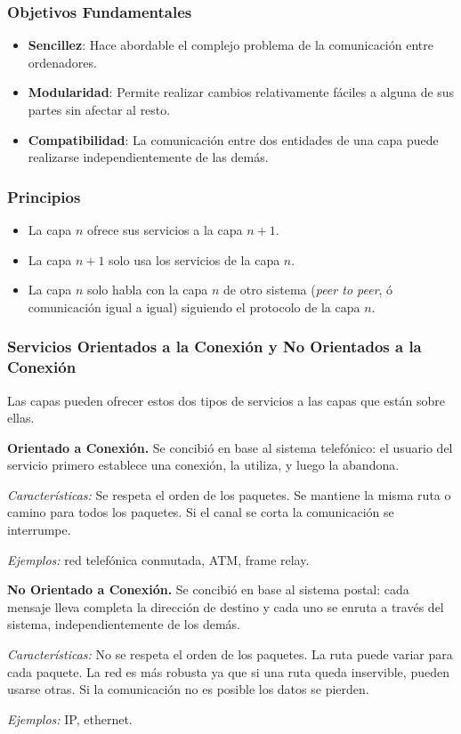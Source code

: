\documentclass[10pt,a4paper]{article}
\begin{document}
\subsubsection{Objetivos Fundamentales}
\begin{itemize}
\item \textbf{Sencillez}: Hace abordable el complejo problema de la comunicación entre ordenadores.
\item \textbf{Modularidad}: Permite realizar cambios relativamente fáciles a alguna de sus partes sin afectar al resto.
\item \textbf{Compatibilidad}: La comunicación entre dos entidades de una capa puede realizarse independientemente de las demás.
\end{itemize}

\subsubsection{Principios}
\begin{itemize}
\item La capa $n$ ofrece sus servicios a la capa $n+1$.
\item La capa $n+1$ solo usa los servicios de la capa $n$.
\item La capa $n$ solo habla con la capa $n$ de otro sistema (\textit{peer to peer}, ó comunicación igual a igual) siguiendo el protocolo de la capa $n$.
\end{itemize}

\subsubsection{Servicios Orientados a la Conexión y No Orientados a la Conexión}

Las capas pueden ofrecer estos dos tipos de servicios a las capas que están sobre ellas.
\begin{description}
\item \textbf{Orientado a Conexión.} Se concibió en base al sistema telefónico: el usuario del servicio primero establece una conexión, la utiliza, y luego la abandona.

\textit{Características:} Se respeta el orden de los paquetes. Se mantiene la misma ruta o camino para todos los paquetes. Si el canal se corta la comunicación se interrumpe.

\textit{Ejemplos:} red telefónica conmutada, ATM, frame relay.
\item \textbf{No Orientado a Conexión.} Se concibió en base al sistema postal: cada mensaje lleva completa la dirección de destino y cada uno se enruta a través del sistema, independientemente de los demás.

\textit{Características:} No se respeta el orden de los paquetes. La ruta puede variar para cada paquete. La red es más robusta ya que si una ruta queda inservible, pueden usarse otras. Si la comunicación  no es posible los datos se pierden.

\textit{Ejemplos:} IP, ethernet.
\end{description}
\end{document}
